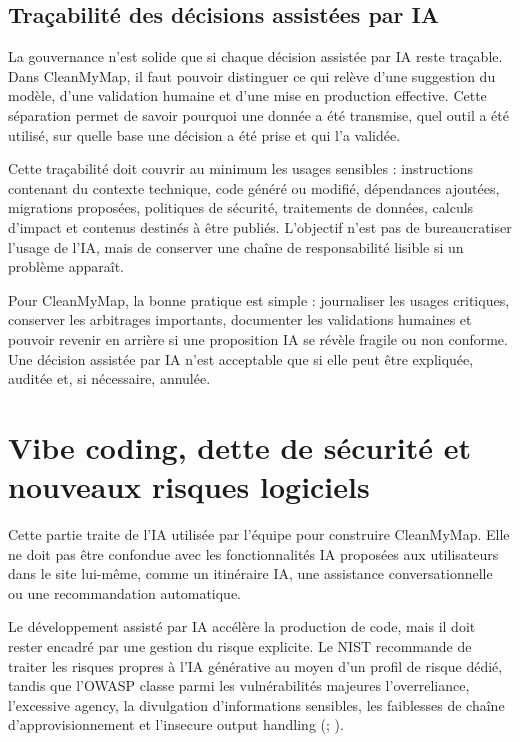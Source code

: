 \documentclass[
  10pt,
  a4paper,
  DIV=11,
  numbers=noendperiod,
  oneside]{scrreprt}
\begin{document}
\subsection{Traçabilité des décisions assistées par
IA}\label{trauxe7abilituxe9-des-duxe9cisions-assistuxe9es-par-ia}

La gouvernance n'est solide que si chaque décision assistée par IA reste
traçable. Dans CleanMyMap, il faut pouvoir distinguer ce qui relève
d'une suggestion du modèle, d'une validation humaine et d'une mise en
production effective. Cette séparation permet de savoir pourquoi une
donnée a été transmise, quel outil a été utilisé, sur quelle base une
décision a été prise et qui l'a validée.

Cette traçabilité doit couvrir au minimum les usages sensibles :
instructions contenant du contexte technique, code généré ou modifié,
dépendances ajoutées, migrations proposées, politiques de sécurité,
traitements de données, calculs d'impact et contenus destinés à être
publiés. L'objectif n'est pas de bureaucratiser l'usage de l'IA, mais de
conserver une chaîne de responsabilité lisible si un problème apparaît.

Pour CleanMyMap, la bonne pratique est simple : journaliser les usages
critiques, conserver les arbitrages importants, documenter les
validations humaines et pouvoir revenir en arrière si une proposition IA
se révèle fragile ou non conforme. Une décision assistée par IA n'est
acceptable que si elle peut être expliquée, auditée et, si nécessaire,
annulée.

\section{Vibe coding, dette de sécurité et nouveaux risques
logiciels}\label{vibe-coding-dette-de-suxe9curituxe9-et-nouveaux-risques-logiciels}

Cette partie traite de l'IA utilisée par l'équipe pour construire
CleanMyMap. Elle ne doit pas être confondue avec les fonctionnalités IA
proposées aux utilisateurs dans le site lui-même, comme un itinéraire
IA, une assistance conversationnelle ou une recommandation automatique.

Le développement assisté par IA accélère la production de code, mais il
doit rester encadré par une gestion du risque explicite. Le NIST
recommande de traiter les risques propres à l'IA générative au moyen
d'un profil de risque dédié, tandis que l'OWASP classe parmi les
vulnérabilités majeures l'overreliance, l'excessive agency, la
divulgation d'informations sensibles, les faiblesses de chaîne
d'approvisionnement et l'insecure output handling
(;
).
\end{document}
